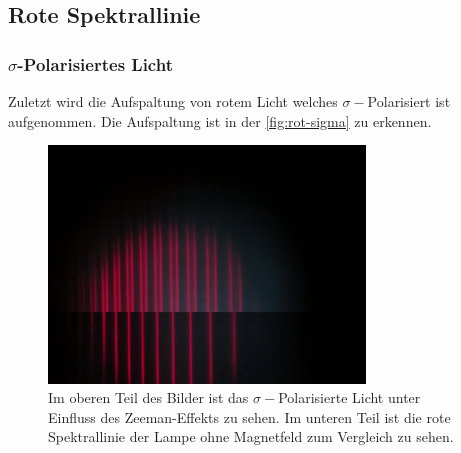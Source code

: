 \subsection{Rote Spektrallinie}
\subsubsection{\boldmath\texorpdfstring{$\sigma$}{sigma}-Polarisiertes Licht}
Zuletzt wird die Aufspaltung von rotem Licht welches $\sigma -$Polarisiert ist aufgenommen.
Die Aufspaltung ist in der \autoref{fig:rot-sigma} zu erkennen.

\begin{figure}
    \centering
    \includegraphics[width=0.75\textwidth]{content/data/Rot_0_sigma_uebernander.JPG}
    \caption{Im oberen Teil des Bilder ist das $\sigma -$Polarisierte Licht unter Einfluss des Zeeman-Effekts zu sehen. Im unteren Teil ist die rote Spektrallinie der Lampe ohne Magnetfeld zum Vergleich zu sehen.}
    \label{fig:rot-sigma}
\end{figure}

